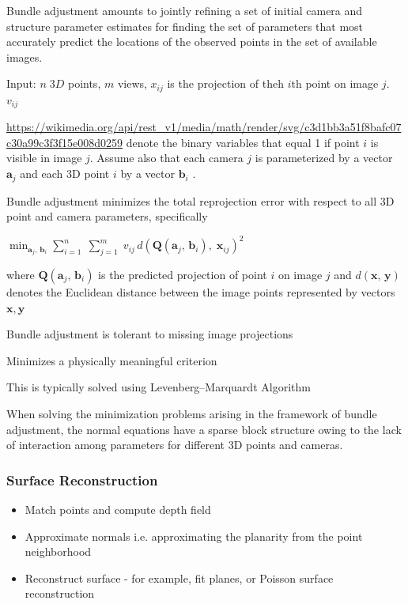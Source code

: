 Bundle adjustment amounts to jointly refining a set of initial camera and structure parameter estimates for finding the set of parameters that most accurately predict the locations of the observed points in the set of available images. 

Input: $n \; 3D$ points, $m$ views, $x_{ij}$ is the projection of theh $i$th point on image $j$. $v_{ij}$

\url{https://wikimedia.org/api/rest_v1/media/math/render/svg/c3d1bb3a51f8bafc07c30a99c3f3f15e008d0259}
 denote the binary variables that equal 1 if point $i$ is visible in image $j$. Assume also that each camera $j$  is parameterized by a vector $\mathbf{a}_{j}$ and each 3D point $i$ by a vector $\mathbf{b}_{i}$ . 

Bundle adjustment minimizes the total reprojection error with respect to all 3D point and camera parameters, specifically

$\min _{{{\mathbf  {a}}_{j},\,{\mathbf  {b}}_{i}}}\displaystyle \sum _{{i=1}}^{{n}}\;\displaystyle \sum _{{j=1}}^{{m}}\;v_{{ij}}\,d({\mathbf  {Q}}({\mathbf  {a}}_{j},\,{\mathbf  {b}}_{i}),\;{\mathbf{x}}_{{ij}})^{2}$

where $\mathbf {Q} (\mathbf {a} _{j},\,\mathbf {b} _{i})$ is the predicted projection of point $i$ on image $j$ and $d(\mathbf {x} ,\,\mathbf {y} )$  denotes the Euclidean distance between the image points represented by vectors $\mathbf{x,y}$

Bundle adjustment is tolerant to missing image projections 

Minimizes a physically meaningful criterion

This is typically solved using Levenberg–Marquardt Algorithm

When solving the minimization problems arising in the framework of bundle adjustment, the normal equations have a sparse block structure owing to the lack of interaction among parameters for different 3D points and cameras.


\subsubsection{Surface Reconstruction}

\begin{itemize}
\item Match points and compute depth field
\item Approximate normals i.e. approximating the planarity from the point neighborhood
\item  Reconstruct surface - for example, fit planes, or Poisson surface reconstruction
\end{itemize}

